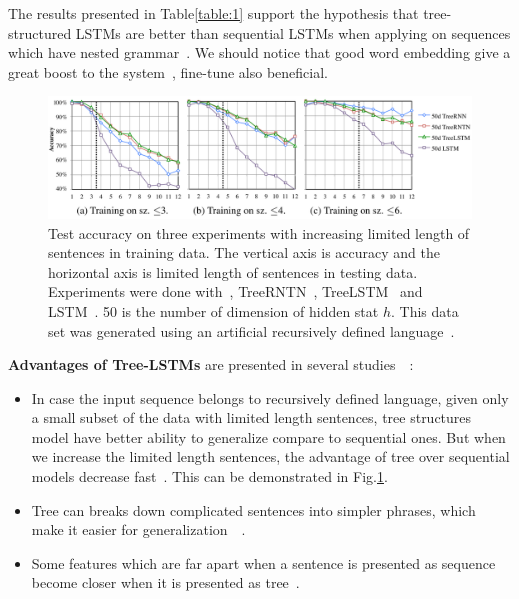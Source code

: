 The results presented in Table\ref{table:1} support the hypothesis that tree-structured LSTMs are better than sequential LSTMs when applying on sequences which have nested grammar~\cite{treeVSseq}.
We should notice that good word embedding give a great boost to the system~\cite{Luong_betterword}, fine-tune also beneficial.

\begin{figure}[H]
    \centering
    \includegraphics[scale=0.38]{figure/tree-vs-seq}
    \caption[Test accuracy vs sentence length]{Test accuracy on three experiments with increasing limited length of sentences in training data.
The vertical axis is accuracy and the horizontal axis is limited length of sentences in testing data.
Experiments were done with~\cite{socher2013recursive}, TreeRNTN~\cite{socher2013recursive}, TreeLSTM~\cite{treeLSTM} and LSTM~\cite{originLSTM}.
50 is the number of dimension of hidden stat \(h\).
This data set was generated using an artificial recursively defined language~\cite{bowman-treevslstm}.}
    \label{fig:tree-vs-seq}
\end{figure}
\label{sec:tree-discuss}
\textbf{Advantages of Tree-LSTMs} are presented in several studies~\cite{need-tree}~\cite{bowman-treevslstm}: \label{treelstm-advantage}
\begin{itemize}
\item In case the input sequence belongs to recursively defined language, given only a small subset of the data with limited length sentences, tree structures model have better ability to generalize compare to sequential ones.
But when we increase the limited length sentences, the advantage of tree over sequential models decrease fast~\cite{bowman-treevslstm}. 
This can be demonstrated in Fig.\ref{fig:tree-vs-seq}.
\item Tree can breaks down complicated sentences into simpler phrases, which make it easier for generalization~\cite{knowledge-matter}~\cite{need-tree}.
\item Some features which are far apart when a sentence is presented as sequence become closer when it is presented as tree~\cite{need-tree}.
\end{itemize}


